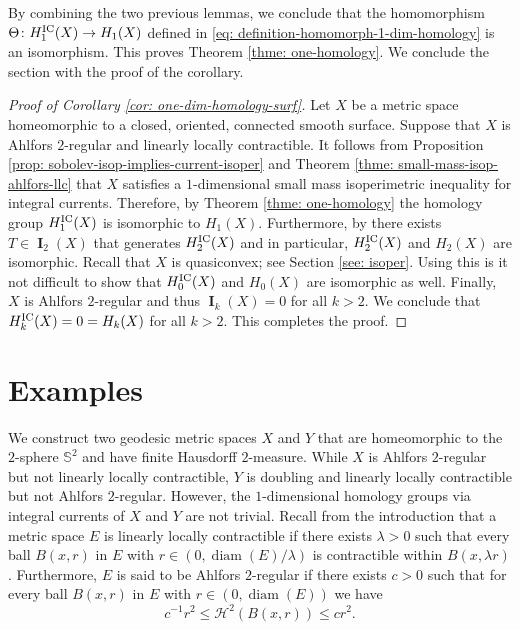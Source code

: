 \documentclass{amsart}
\numberwithin{equation}{section}
\newcommand{\Ha}{\mathcal{H}}
\newcommand{\diam}{\operatorname{diam}}
\DeclareMathOperator{\bI}{\mathbf{I}}
\begin{document}
        By combining the two previous lemmas, we conclude that the homomorphism $\Theta \colon H_1^\textup{IC}(X)\to H_1(X)$ defined in \eqref{eq: definition-homomorph-1-dim-homology} is an isomorphism. This proves Theorem \ref{thme: one-homology}. We conclude the section with the proof of the corollary.
    
       \begin{proof}[Proof of Corollary \ref{cor: one-dim-homology-surf}]
            Let $X$ be a metric space homeomorphic to a closed, oriented, connected smooth surface. Suppose that $X$ is Ahlfors $2$-regular and linearly locally contractible. It follows from Proposition \ref{prop: sobolev-isop-implies-current-isoper} and Theorem \ref{thme: small-mass-isop-ahlfors-llc} that $X$ satisfies a $1$-dimensional small mass isoperimetric inequality for integral currents. Therefore, by Theorem \ref{thme: one-homology} the homology group $H_1^\textup{IC}(X)$ is isomorphic to $H_1(X)$. Furthermore, by \cite[Theorem 1.3]{basso2023geometric} there exists $T \in \bI_2(X)$ that generates $H_2^\textup{IC}(X)$ and in particular, $H_2^\textup{IC}(X)$ and $H_2(X)$ are isomorphic. Recall that $X$ is quasiconvex; see Section \ref{see: isoper}. Using this is it not difficult to show that $H_0^\textup{IC}(X)$ and $H_0(X)$ are isomorphic as well. Finally, $X$ is Ahlfors $2$-regular and thus $\bI_k(X)=0$ for all $k>2$. We conclude that $H_k^\textup{IC}(X) = 0 = H_k(X)$ for all $k >2$. This completes the proof. 
        \end{proof}
    
\section{Examples}\label{sec: examples}
    We construct two geodesic metric spaces $X$ and $Y$ that are homeomorphic to the $2$-sphere $\mathbb{S}^2$ and have finite Hausdorff $2$-measure. While $X$ is Ahlfors $2$-regular but not linearly locally contractible, $Y$ is doubling and linearly locally contractible but not Ahlfors $2$-regular. However, the $1$-dimensional homology groups via integral currents of $X$ and $Y$ are not trivial. 
    Recall from the introduction that a metric space $E$ is linearly locally contractible if there exists $\lambda>0$ such that every ball $B(x,r)$ in $E$ with $r\in (0,\diam( E)/ \lambda)$ is contractible within $B(x,\lambda r)$. Furthermore, $E$ is said to be Ahlfors $2$-regular if there exists $c>0$ such that for every ball $B(x,r)$ in $E$ with $r\in (0,\diam (E))$ we have
    $$c^{-1} r^2 \leq \Ha^2(B(x,r)) \leq cr^2.$$
    
\end{document}
